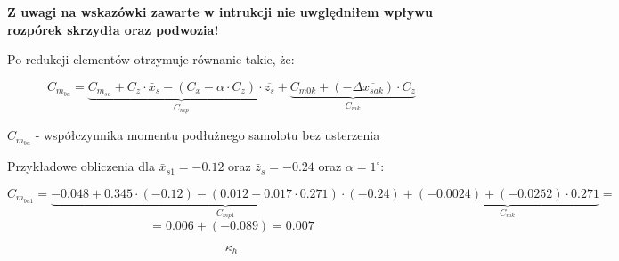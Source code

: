 \documentclass[a4paper, twoside]{report}
\begin{document}
\textbf{Z uwagi na wskazówki zawarte w intrukcji nie uwględniłem wpływu rozpórek skrzydła oraz podwozia!}

Po redukcji elementów otrzymuje równanie takie, że:

\[
C_{m_{bu}}= \underbrace{C_{m_{sa}} + C_z\cdot \bar{x}_s -(C_x - \alpha \cdot C_z)\cdot \overline{z_s}}_\text{$C_{mp}$} + \underbrace{C_{m0k}+(-\Delta \overline{x_{sak}})\cdot C_z}_\text{$C_{mk}$}
\]

$C_{m_{bu}}$ - współczynnika momentu podłużnego samolotu bez usterzenia

Przykładowe obliczenia dla $\bar{x}_{s1} = -0.12$ oraz $\bar{z}_s = -0.24$ oraz $\alpha = 1 ^\circ$:

\[
C_{m_{bu1}} = \underbrace{-0.048 + 0.345\cdot (-0.12) - (0.012 - 0.017 \cdot 0.271)\cdot (-0.24)}_\text{$C_{mp1}$} + \underbrace{(-0.0024) + (-0.0252)\cdot 0.271}_\text{$C_{mk}$} =
\]
\[
= 0.006+(-0.089) = 0.007
\]

\[
\kappa_h

\]






\end{document}

